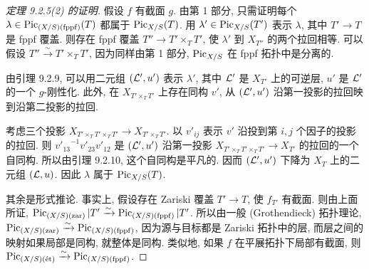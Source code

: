 \begin{proof}[定理 9.2.5(2) 的证明]
假设 $f$ 有截面 $g$. 由第 1 部分, 只需证明每个 $\lambda\in\PF(T)$ 都属于 $\Pic_{X/S}(T)$. 用 $\lambda'\in\Pic_{X/S}(T')$ 表示 $\lambda$, 其中 $T'\to T$ 是 fppf 覆盖. 则存在 fppf 覆盖 $T''\to T'\times_TT'$, 使 $\lambda'$ 到 $X_{T''}$ 的两个拉回相等. 可以假设 $T''\xrightarrow{\sim}T'\times_TT'$, 因为同样由第 1 部分, $\Pic_{X/S}$ 在 fppf 拓扑中是分离的.

由引理 9.2.9, 可以用二元组 $(\L',u')$ 表示 $\lambda'$, 其中 $\L'$ 是 $X_{T'}$ 上的可逆层, $u'$ 是 $\L'$ 的一个 $g$-刚性化. 此外, 在 $X_{T'\times_TT'}$ 上存在同构 $v'$, 从 $(\L',u')$ 沿第一投影的拉回映到沿第二投影的拉回.

考虑三个投影 $X_{T'\times_TT'\times_TT'}\to X_{T'\times_TT'}$. 以 $v'_{ij}$ 表示 $v'$ 沿投到第 $i,j$ 个因子的投影的拉回. 则 ${v'_{13}}^{-1}v'_{23}v'_{12}$ 是 $(\L',u')$ 沿第一投影 $X_{T'\times_TT'\times_TT'}\to X_{T'}$ 的拉回的一个自同构. 所以由引理 9.2.10, 这个自同构是平凡的. 因而 $(\L',u')$ 下降为 $X_T$ 上的二元组 $(\L,u)$. 因此 $\lambda$ 属于 $\Pic_{X/S}(T)$.

其余是形式推论. 事实上, 假设存在 Zariski 覆盖 $T'\to T$, 使 $f_{T'}$ 有截面. 则由上面所证, $\PZ|T'\xrightarrow{\sim}\PF|T'$. 所以由一般 (Grothendieck) 拓扑理论, $\PZ\xrightarrow{\sim}\PF$, 因为源与目标都是 Zariski 拓扑中的层, 而层之间的映射如果局部是同构,
就整体是同构. 类似地, 如果 $f$ 在平展拓扑下局部有截面, 则 $\PE\xrightarrow{\sim}\PF$.
\end{proof}

